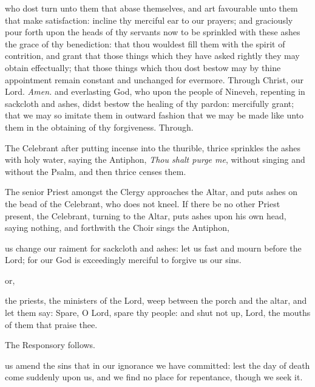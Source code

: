 {} who dost turn unto them that abase themselves, and art favourable unto them that make satisfaction: incline thy merciful ear to our prayers; and graciously pour forth upon the heads of thy servants now to be sprinkled with these ashes the grace of thy benediction: that thou wouldest fill them with the spirit of contrition, and grant that those things which they have asked rightly they may obtain effectually; that those things which thou dost bestow may by thine appointment remain constant and unchanged for evermore. Through Christ, our Lord. \textit{Amen.}
{} and everlasting God, who upon the people of Nineveh, repenting in sackcloth and ashes, didst bestow the healing of thy pardon: mercifully grant; that we may so imitate them in outward fashion that we may be made like unto them in the obtaining of thy forgiveness. Through.
\begin{rubric}
    The Celebrant after putting incense into the thurible, thrice sprinkles the ashes with holy water, saying the Antiphon, \emph{Thou shalt purge me}, without singing and without the Psalm, and then thrice censes them.
\end{rubric}
\begin{rubric}
    The senior Priest amongst the Clergy approaches the Altar, and puts ashes on the bead of the Celebrant, who does not kneel. If there be no other Priest present, the Celebrant, turning to the Altar, puts ashes upon his own head, saying nothing, and forthwith the Choir sings the Antiphon,
\end{rubric}
 us change our raiment for sackcloth and ashes: let us fast and mourn before the Lord; for our God is exceedingly merciful to forgive us our sins.
\begin{inhead}
    or,
\end{inhead}
 the priests, the ministers of the Lord, weep between the porch and the altar, and let them say: Spare, O Lord, spare thy people: and shut not up, Lord, the mouths of them that praise thee.
\begin{rubric}
    The Responsory follows.
\end{rubric}
 us amend the sins that in our ignorance we have committed: lest the day of death come suddenly upon us, and we find no place for repentance, though we seek it.\par
{}
